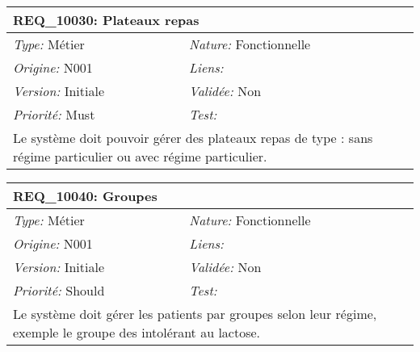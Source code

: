 \begin{table}[!h]

\begin{tabular}{|p{60mm}p{100mm}|}

\hline

\multicolumn{2}{|l|}{\textbf{REQ\_10030:} Plateaux repas} \\ \hline

\emph{Type:} Métier & \emph{Nature:} Fonctionnelle \\

\emph{Origine:} N001 & \emph{Liens:}  \\

\emph{Version:} Initiale & \emph{Validée:} Non \\

\emph{Priorité:} Must & \emph{Test:} \\ \hline

\multicolumn{2}{|p{16cm}|}{Le système doit pouvoir gérer des plateaux repas de type : sans régime particulier ou avec régime particulier.} \\ \hline

\end{tabular}

\end{table}



\begin{table}[!h]

\begin{tabular}{|p{60mm}p{100mm}|}

\hline

\multicolumn{2}{|l|}{\textbf{REQ\_10040:} Groupes} \\ \hline

\emph{Type:} Métier & \emph{Nature:} Fonctionnelle \\

\emph{Origine:} N001 & \emph{Liens:}  \\

\emph{Version:} Initiale & \emph{Validée:} Non \\

\emph{Priorité:} Should & \emph{Test:} \\ \hline

\multicolumn{2}{|p{16cm}|}{Le système doit gérer les patients par groupes selon leur régime, exemple le groupe des intolérant au lactose.} \\ \hline

\end{tabular}

\end{table}



